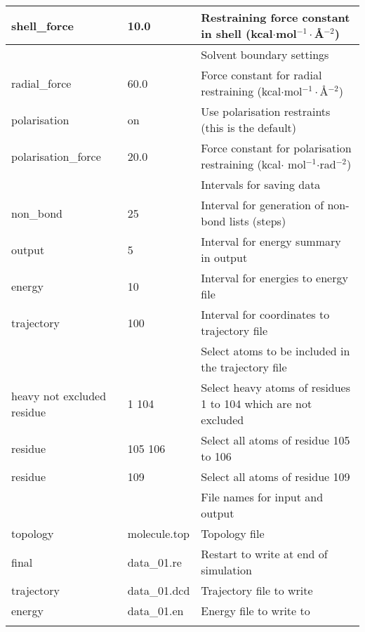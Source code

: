 \documentclass[a4paper,11pt]{article}
\begin{document}
\begin{longtable}{|p{105pt} p{60pt}|p{235pt}|}
  \hline shell{\_}force           & 10.0         & Restraining force constant in shell (kcal$\cdot $mol$^{-1}\cdot ${\AA}$^{-2}$) \\
  \hline [solvent]                &              & Solvent boundary settings \\
  \hline radial{\_}force          & 60.0         & Force constant for radial restraining (kcal$\cdot $mol$^{-1}\cdot ${\AA}$^{-2}$) \\
  \hline polarisation             & on           & Use polarisation restraints (this is the default) \\
  \hline polarisation{\_}force    & 20.0         & Force constant for polarisation restraining (kcal$\cdot$ mol$^{-1}$$\cdot$rad$^{-2}$) \\
  \hline [intervals]              &              & Intervals for saving data \\
  \hline non{\_}bond              & 25           & Interval for generation of non-bond lists (steps) \\
  \hline output                   & 5            & Interval for energy summary in output \\
  \hline energy                   & 10           & Interval for energies to energy file \\
  \hline trajectory               & 100          & Interval for coordinates to trajectory file \\
  \hline [trajectory{\_}atoms]    &              & Select atoms to be included in the trajectory file \\
  \hline heavy not excluded residue & 1 104      & Select heavy atoms of residues 1 to 104 which are not excluded \\
  \hline residue                  & 105 106      & Select all atoms of residue 105 to 106 \\
  \hline residue                  & 109          & Select all atoms of residue 109 \\
  \hline [files]                  &              & File names for input and output \\
  \hline topology                 & molecule.top    & Topology file \\
  \hline final                    & data{\_}01.re   & Restart to write at end of simulation \\
  \hline trajectory               & data{\_}01.dcd  & Trajectory file to write \\
  \hline energy                   & data{\_}01.en   & Energy file to write to \\
$$
\end{longtable}
\end{document}
